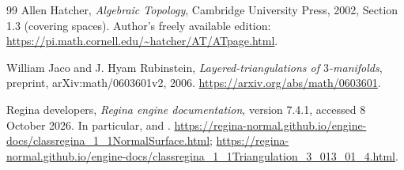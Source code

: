 \begin{thebibliography}{99}
Allen Hatcher, \emph{Algebraic Topology}, Cambridge University Press,
2002, Section 1.3 (covering spaces).
Author's freely available edition:
\url{https://pi.math.cornell.edu/~hatcher/AT/ATpage.html}.

William Jaco and J. Hyam Rubinstein,
\emph{Layered-triangulations of $3$-manifolds},
preprint, arXiv:math/0603601v2, 2006.
\url{https://arxiv.org/abs/math/0603601}.

Regina developers, \emph{Regina engine documentation}, version 7.4.1,
accessed 8 October 2026. In particular,
 and
.
\url{https://regina-normal.github.io/engine-docs/classregina_1_1NormalSurface.html};
\url{https://regina-normal.github.io/engine-docs/classregina_1_1Triangulation_3_013_01_4.html}.

\end{thebibliography}
